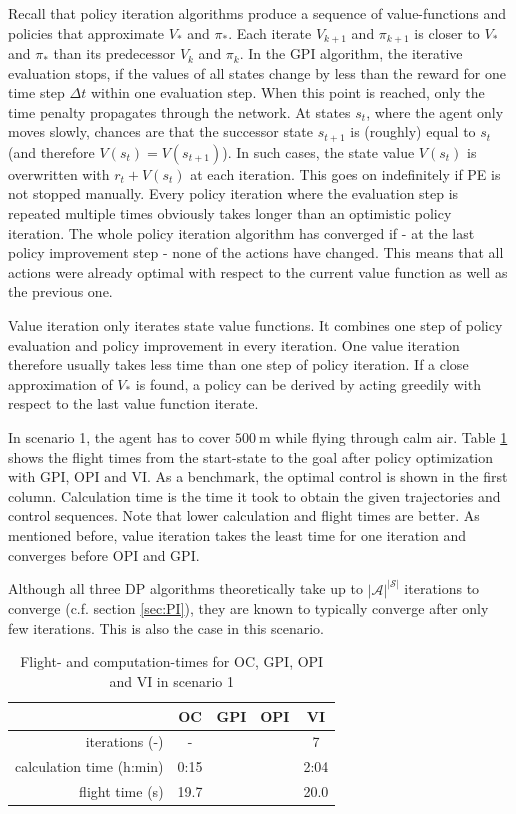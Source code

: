 Recall that policy iteration algorithms produce a sequence of value-functions and policies that approximate $V_*$ and $\pi_*$. Each iterate $V_{k+1}$ and $\pi_{k+1}$ is closer to $V_*$ and $\pi_*$ than its predecessor $V_k$ and $\pi_k$.
In the GPI algorithm, the iterative evaluation stops, if the values of all states change by less than the reward for one time step $\Delta t$ within one evaluation step. When this point is reached, only the time penalty propagates through the network. At states $s_t$, where the agent only moves slowly, chances are that the successor state $s_{t+1}$ is (roughly) equal to $s_t$ (and therefore $V(s_t)=V(s_{t+1})$). In such cases, the state value $V(s_t)$ is overwritten with $r_t + V(s_t)$ at each iteration. This goes on indefinitely if PE is not stopped manually. Every policy iteration where the evaluation step is repeated multiple times obviously takes longer than an optimistic policy iteration. The whole policy iteration algorithm has converged if - at the last policy improvement step - none of the actions have changed. This means that all actions were already optimal with respect to the current value function as well as the previous one. \smallbreak

Value iteration only iterates state value functions. It combines one step of policy evaluation and policy improvement in every iteration. One value iteration therefore usually takes less time than one step of policy iteration. If a close approximation of $V_*$ is found, a policy can be derived by acting greedily with respect to the last value function iterate.

In scenario 1, the agent has to cover $500~\text{m}$ while flying through calm air. Table \ref{tab:2d_flight_data_500m} shows the flight times from the start-state to the goal after policy optimization with GPI, OPI and VI. As a benchmark, the optimal control  is shown in the first column. Calculation time is the time it took to obtain the given trajectories and control sequences. Note that lower calculation and flight times are better. As mentioned before, value iteration takes the least time for one iteration and converges before OPI and GPI.

Although all three DP algorithms theoretically take up to $|\mathcal{A}|^{|\mathcal{S}|}$ iterations to converge (c.f. section \ref{sec:PI}), they are known to typically converge after only few iterations. This is also the case in this scenario.

\begin{table}[h]
	\begin{center}
		\begin{tabular}{r|c c c c}
			 & OC & GPI & OPI & VI \\ \hline
			iterations (-) & - & & & 7 \\
			calculation time (h:min) & 0:15 & & & 2:04 \\
			flight time (s) & 19.7 & & & 20.0
		\end{tabular}
		\caption{Flight- and computation-times for OC, GPI, OPI and VI in scenario 1}
		\label{tab:2d_flight_data_500m}
	\end{center}
\end{table}

